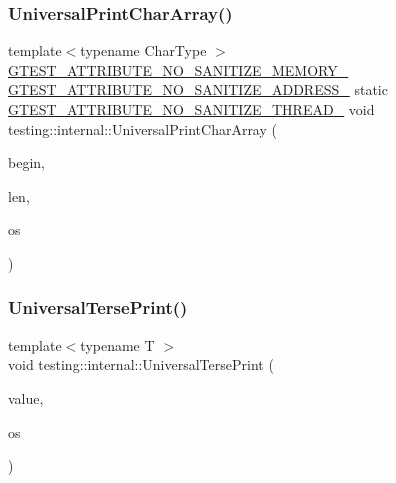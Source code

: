 \mbox{\label{namespacetesting_1_1internal_ad896a4e4d9133ce43dc18b6038d95dc3}} 
\subsubsection{\texorpdfstring{UniversalPrintCharArray()}{UniversalPrintCharArray()}}
{\footnotesize\ttfamily template$<$typename Char\+Type $>$ \\
\mbox{\hyperlink{gtest-port_8h_a2a83dd79037e53814a509cc3f5702650}{G\+T\+E\+S\+T\+\_\+\+A\+T\+T\+R\+I\+B\+U\+T\+E\+\_\+\+N\+O\+\_\+\+S\+A\+N\+I\+T\+I\+Z\+E\+\_\+\+M\+E\+M\+O\+R\+Y\+\_\+}} \mbox{\hyperlink{gtest-port_8h_af18b465f4ba6e36eea7a8d2d79521873}{G\+T\+E\+S\+T\+\_\+\+A\+T\+T\+R\+I\+B\+U\+T\+E\+\_\+\+N\+O\+\_\+\+S\+A\+N\+I\+T\+I\+Z\+E\+\_\+\+A\+D\+D\+R\+E\+S\+S\+\_\+}} static \mbox{\hyperlink{gtest-port_8h_abf30a6b1b3a12ecb2cc1bc1a6f5f9646}{G\+T\+E\+S\+T\+\_\+\+A\+T\+T\+R\+I\+B\+U\+T\+E\+\_\+\+N\+O\+\_\+\+S\+A\+N\+I\+T\+I\+Z\+E\+\_\+\+T\+H\+R\+E\+A\+D\+\_\+}} void testing\+::internal\+::\+Universal\+Print\+Char\+Array (\begin{DoxyParamCaption}\item[{const Char\+Type $\ast$}]{begin,  }\item[{size\+\_\+t}]{len,  }\item[{ostream $\ast$}]{os }\end{DoxyParamCaption})\hspace{0.3cm}{\ttfamily [static]}}

\mbox{\label{namespacetesting_1_1internal_afa92f5a284929dc3723e654a25feb7b9}} 
\subsubsection{\texorpdfstring{UniversalTersePrint()}{UniversalTersePrint()}}
{\footnotesize\ttfamily template$<$typename T $>$ \\
void testing\+::internal\+::\+Universal\+Terse\+Print (\begin{DoxyParamCaption}\item[{const T \&}]{value,  }\item[{\+::std\+::ostream $\ast$}]{os }\end{DoxyParamCaption})}

